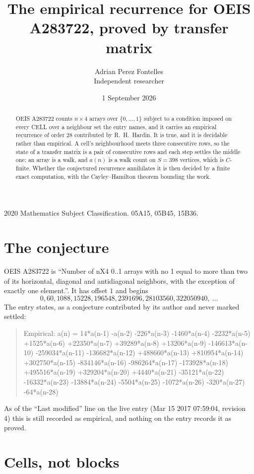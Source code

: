 \documentclass[11pt,a4paper]{article}
\title{The empirical recurrence for OEIS A283722, proved by transfer matrix}
\author{Adrian Perez Fontelles\\ \small Independent researcher}
\date{1 September 2026}
\theoremstyle{plain}
\theoremstyle{definition}
\begin{document}
\maketitle

\begin{abstract}
OEIS A283722 counts $n\times4$ arrays over $\{0,\dots,1\}$ subject to a condition imposed on
every CELL over a neighbour set the entry names, and it carries an empirical recurrence of
order $28$ contributed by R.~H.~Hardin. It is true, and it is decidable rather than
empirical. A cell's neighbourhood meets three consecutive rows, so the state of a transfer
matrix is a pair of consecutive rows and each step settles the middle one; an array is a
walk, and $a(n)$ is a walk count on $S=398$ vertices, which is $C$-finite. Whether the
conjectured recurrence annihilates it is then decided by a finite exact computation, with the
Cayley--Hamilton theorem bounding the work.
\end{abstract}

\noindent\small 2020 Mathematics Subject Classification. 05A15, 05B45, 15B36.\normalsize

\section{The conjecture}

OEIS A283722 is ``Number of nX4 0..1 arrays with no 1 equal to more than two of its horizontal, diagonal and antidiagonal neighbors, with the exception of exactly one element.''. It has offset $1$ and begins
\[
0, 60, 1088, 15228, 196548, 2391696, 28103560, 322050940,\ \dots
\]
The entry states, as a conjecture contributed by its author and never marked settled:
\begin{quote}
Empirical: a(n) = 14*a(n-1) -a(n-2) -226*a(n-3) -1460*a(n-4) -2232*a(n-5) +1525*a(n-6) +22350*a(n-7) +39289*a(n-8) +13206*a(n-9) -146613*a(n-10) -259034*a(n-11) -136682*a(n-12) +488660*a(n-13) +810954*a(n-14) +302750*a(n-15) -834146*a(n-16) -986264*a(n-17) -173928*a(n-18) +495516*a(n-19) +329204*a(n-20) +4440*a(n-21) -35121*a(n-22) -16332*a(n-23) -13884*a(n-24) -5504*a(n-25) -1072*a(n-26) -320*a(n-27) -64*a(n-28)
\end{quote}
As of the ``Last modified'' line on the live entry (Mar 15 2017 07:59:04, revision 4) this is still
recorded as empirical, and nothing on the entry records it as proved.

\section{Cells, not blocks}
\end{document}
